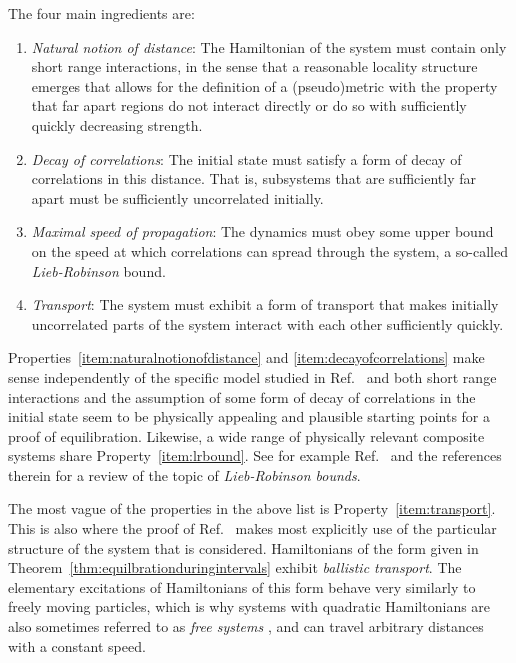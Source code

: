 \documentclass[a4paper,12pt,listof=totoc,index=totoc,bibliography=totoc,headsepline=false,headings=normal,BCOR16.153846mm,DIV12,headinclude,twoside,cleardoublepage=empty,numbers=noenddot,final]{scrreprt}
\theoremstyle{mystyle}
\numberwithin{equation}{section}
\numberwithin{figure}{section}
\numberwithin{lemma}{section}
\numberwithin{theorem}{section}
\numberwithin{corollary}{section}
\numberwithin{definition}{section}
\numberwithin{conjecture}{section}
\numberwithin{observation}{section}
\newcommand{\+}{\mkern2mu}
\DeclareMathOperator{\1}{\mathds{1}}
\begin{document}
The four main ingredients are:
\begin{enumerate}[leftmargin=*]
\item \label{item:naturalnotionofdistance}\emph{Natural notion of distance}: The Hamiltonian of the system must contain only short range interactions, in the sense that a reasonable locality structure emerges that allows for the definition of a (pseudo)metric with the property that far apart regions do not interact directly or do so with sufficiently quickly decreasing strength.
\item \label{item:decayofcorrelations}\emph{Decay of correlations}: The initial state must satisfy a form of decay of correlations in this distance. That is, subsystems that are sufficiently far apart must be sufficiently uncorrelated initially.
\item \label{item:lrbound}\emph{Maximal speed of propagation}: The dynamics must obey some upper bound on the speed at which correlations can spread through the system, a so-called \emph{Lieb-Robinson} \cite{Lieb1972,Kliesch2013} bound.
\item \label{item:transport}\emph{Transport}: The system must exhibit a form of transport that makes initially uncorrelated parts of the system interact with each other sufficiently quickly.
\end{enumerate}
Properties~\ref{item:naturalnotionofdistance} and \ref{item:decayofcorrelations} make sense independently of the specific model studied in Ref.~\cite{cramer10_1} and both short range interactions and the assumption of some form of decay of correlations in the initial state seem to be physically appealing and plausible starting points for a proof of equilibration.
Likewise, a wide range of physically relevant composite systems share Property~\ref{item:lrbound}.
See for example Ref.~\cite{Kliesch2013} and the references therein for a review of the topic of \emph{Lieb-Robinson bounds}.

The most vague of the properties in the above list is Property~\ref{item:transport}.
This is also where the proof of Ref.~\cite{cramer10_1} makes most explicitly use of the particular structure of the system that is considered.
Hamiltonians of the form given in Theorem~\ref{thm:equilbrationduringintervals} exhibit \emph{ballistic transport}.
The elementary excitations of Hamiltonians of this form behave very similarly to freely moving particles, which is why systems with quadratic Hamiltonians are also sometimes referred to as \emph{free systems} \cite{Lanford1972}, and can travel arbitrary distances with a constant speed.
\end{document}
